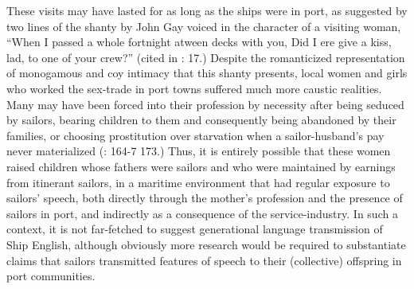 These visits may have lasted for as long as the ships were in port, as suggested by two lines of the shanty by John Gay voiced in the character of a visiting woman, “When I passed a whole fortnight atween decks with you, Did I ere give a kiss, lad, to one of your crew?” (cited in \citealt{Hugill1969}: 17.) Despite the romanticized representation of monogamous and coy intimacy that this shanty presents, local women and girls who worked the sex-trade in port towns suffered much more caustic realities. Many may have been forced into their profession by necessity after being seduced by sailors, bearing children to them and consequently being abandoned by their families, or choosing prostitution over starvation when a sailor-husband’s pay never materialized (\citealt{AdkinsAdkins2008}: 164-7 173.) Thus, it is entirely possible that these women raised children whose fathers were sailors and who were maintained by earnings from itinerant sailors, in a maritime environment that had regular exposure to sailors’ speech, both directly through the mother’s profession and the presence of sailors in port, and indirectly as a consequence of the service-industry. In such a context, it is not far-fetched to suggest generational language transmission of Ship English, although obviously more research would be required to substantiate claims that sailors transmitted features of speech to their (collective) offspring in port communities. 

